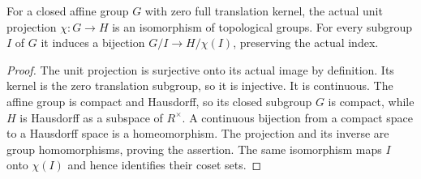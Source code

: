 \begin{lemma}
\label{ft:affine-zero-kernel-isomorphism}
\leanok
For a closed affine group $G$ with zero full translation kernel,
the actual unit projection $\chi:G\longrightarrow H$ is an
isomorphism of topological groups. For every subgroup $I$ of $G$
it induces a bijection $G/I\longrightarrow H/\chi(I)$, preserving
the actual index.
\end{lemma}
\begin{proof}
The unit projection is surjective onto its actual image by definition.
Its kernel is the zero translation subgroup, so it is injective.
It is continuous. The affine group is compact and Hausdorff, so
its closed subgroup $G$ is compact, while $H$ is Hausdorff as a
subspace of $R^\times$. A continuous bijection from a compact
space to a Hausdorff space is a homeomorphism. The projection and
its inverse are group homomorphisms, proving the assertion.
The same isomorphism maps $I$ onto $\chi(I)$ and hence identifies
their coset sets.
\end{proof}
